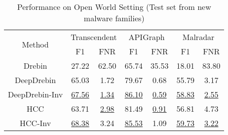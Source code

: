 \begin{table}[htb]
\caption{Performance on Open World Setting (Test set from new malware families)}
\label{tab: new}
\centering
\begin{tabular}{c|cc|cc|cc}
\toprule
\multirow{2}{*}{Method} & \multicolumn{2}{c|}{Transcendent}                  & \multicolumn{2}{c|}{APIGraph}                      & \multicolumn{2}{c}{Malradar}                      \\ \cline{2-7} 
& \multicolumn{1}{c|}{F1}       & \multicolumn{1}{c|}{FNR}        & \multicolumn{1}{c|}{F1}       & \multicolumn{1}{c|}{FNR}      
& \multicolumn{1}{c|}{F1}       & \multicolumn{1}{c}{FNR}      \\ \midrule
Drebin 
& \multicolumn{1}{c|}{27.22} & \multicolumn{1}{c|}{62.50} 
& \multicolumn{1}{c|}{65.74} & \multicolumn{1}{c|}{35.53} 
& \multicolumn{1}{c|}{18.01} & \multicolumn{1}{c}{83.80} \\
\midrule
DeepDrebin
& \multicolumn{1}{c|}{65.03} & \multicolumn{1}{c|}{1.72} 
& \multicolumn{1}{c|}{79.67} & \multicolumn{1}{c|}{0.68} 
& \multicolumn{1}{c|}{55.79} & \multicolumn{1}{c}{3.17} \\
DeepDrebin-Inv
& \multicolumn{1}{c|}{\underline{67.56}} & \multicolumn{1}{c|}{\underline{1.34}}
& \multicolumn{1}{c|}{\underline{86.10}} & \multicolumn{1}{c|}{\underline{0.59}}
& \multicolumn{1}{c|}{\underline{58.83}} & \multicolumn{1}{c}{\underline{2.55}} \\
\midrule
HCC
& \multicolumn{1}{c|}{63.71} & \multicolumn{1}{c|}{\underline{2.98}}
& \multicolumn{1}{c|}{81.49} & \multicolumn{1}{c|}{\underline{0.91}}
& \multicolumn{1}{c|}{56.81} & \multicolumn{1}{c}{4.73} \\
HCC-Inv
& \multicolumn{1}{c|}{\underline{68.38}} & \multicolumn{1}{c|}{3.24} 
& \multicolumn{1}{c|}{\underline{85.53}} & \multicolumn{1}{c|}{1.09} 
& \multicolumn{1}{c|}{\underline{59.73}} & \multicolumn{1}{c}{\underline{3.22}} \\
                      
\bottomrule
\end{tabular}  
\end{table}